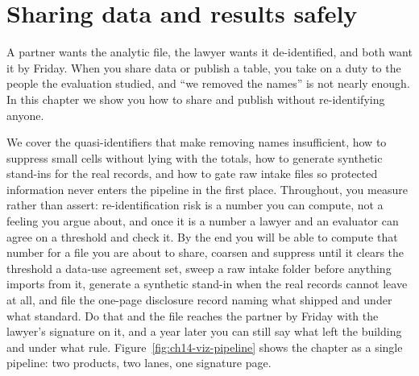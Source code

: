 \chapter{Sharing data and results safely}\label{ch:sharing}

A partner wants the analytic file, the lawyer wants it de-identified, and both want it by Friday. When you share data or publish a table, you take on a duty to the people the evaluation studied, and \enquote{we removed the names} is not nearly enough. In this chapter we show you how to share and publish without re-identifying anyone.

We cover the quasi-identifiers that make removing names insufficient, how to suppress small cells without lying with the totals, how to generate synthetic stand-ins for the real records, and how to gate raw intake files so protected information never enters the pipeline in the first place.  Throughout, you measure rather than assert: re-identification risk is a number you can compute, not a feeling you argue about, and once it is a number a lawyer and an evaluator can agree on a threshold and check it. By the end you will be able to compute that number for a file you are about to share, coarsen and suppress until it clears the threshold a data-use agreement set, sweep a raw intake folder before anything imports from it, generate a synthetic stand-in when the real records cannot leave at all, and file the one-page disclosure record naming what shipped and under what standard. Do that and the file reaches the partner by Friday with the lawyer's signature on it, and a year later you can still say what left the building and under what rule. Figure~\ref{fig:ch14-viz-pipeline} shows the chapter as a single pipeline: two products, two lanes, one signature page.

